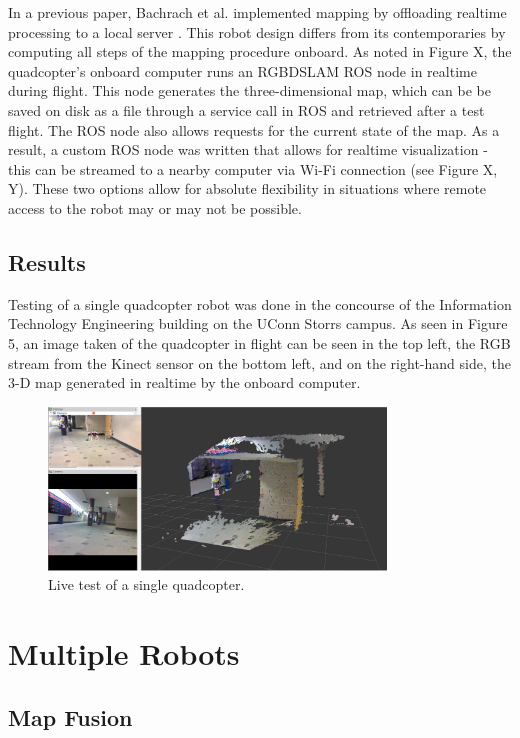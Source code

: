 \documentclass[letterpaper, oneside, 10pt]{report}
\begin{document}
In a previous paper, Bachrach et al. implemented mapping by offloading realtime processing to a local server \cite{bachrach2012estimation}. This robot design differs from its contemporaries by computing all steps of the mapping procedure onboard. As noted in Figure X, the quadcopter's onboard computer runs an RGBDSLAM ROS node in realtime during flight. This node generates the three-dimensional map, which can be be saved on disk as a file through a service call in ROS and retrieved after a test flight. The ROS node also allows requests for the current state of the map. As a result, a custom ROS node was written that allows for realtime visualization - this can be streamed to a nearby computer via Wi-Fi connection (see Figure X, Y). These two options allow for absolute flexibility in situations where remote access to the robot may or may not be possible.

\section{Results}

\noindent Testing of a single quadcopter robot was done in the concourse of the Information Technology Engineering building on the UConn Storrs campus. As seen in Figure 5, an image taken of the quadcopter in flight can be seen in the top left, the RGB stream from the Kinect sensor on the bottom left, and on the right-hand side, the 3-D map generated in realtime by the onboard computer.

\begin{figure}[h]
 \caption{Live test of a single quadcopter.}
 \centering
   \includegraphics[width=0.8\textwidth]{images/single_test}
\end{figure}

\chapter{Multiple Robots}
\section{Map Fusion}
\end{document}
